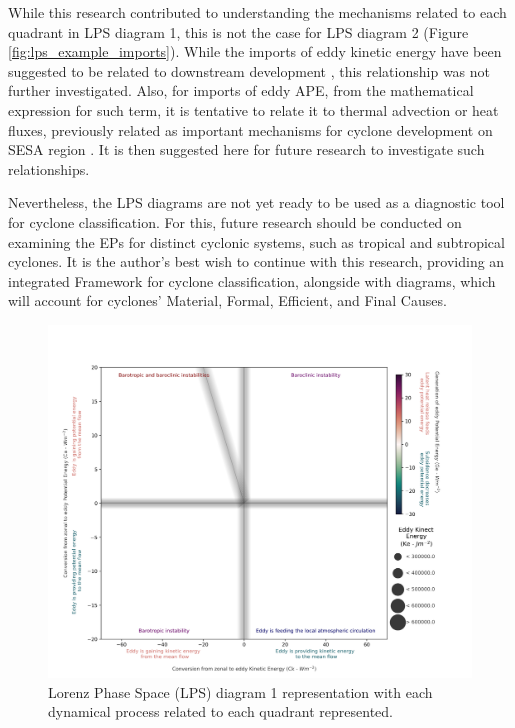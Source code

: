 While this research contributed to understanding the mechanisms related to each quadrant in LPS diagram 1, this is not the case for LPS diagram 2 (Figure \ref{fig:lps_example_imports}). While the imports of eddy kinetic energy have been suggested to be related to downstream development \citep{michaelides1999quasi}, this relationship was not further investigated. Also, for imports of eddy APE, from the mathematical expression for such term, it is tentative to relate it to thermal advection or heat fluxes, previously related as important mechanisms for cyclone development on SESA region \citep{gozzo2014subtropical, dutra2017structure, gramcianinov2019properties}. It is then suggested here for future research to investigate such relationships.

Nevertheless, the LPS diagrams are not yet ready to be used as a diagnostic tool for cyclone classification. For this, future research should be conducted on examining the EPs for distinct cyclonic systems, such as tropical and subtropical cyclones. It is the author's best wish to continue with this research, providing an integrated Framework for cyclone classification, alongside with \citet{hart2003cyclone} diagrams, which will account for cyclones' Material, Formal, Efficient, and Final Causes.

\begin{figure}[!htbp]
\centering
\includegraphics[width=\textwidth]{figs_6/lps_example_mixed.png}
\caption[LPS 1 - Dynamical Processes]{Lorenz Phase Space (LPS) diagram 1 representation with each dynamical process related to each quadrant represented.}
\label{fig:lps_example_mixed}
\end{figure}

